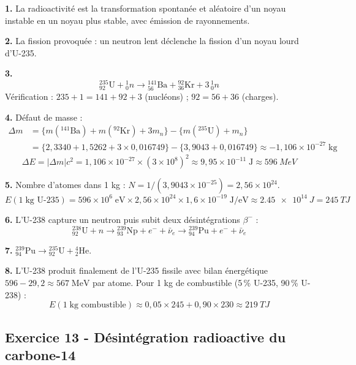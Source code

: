 \documentclass[12pt,a4paper]{article}
\begin{document}
\begin{boitecorrige}
\textbf{1.} La radioactivité est la transformation spontanée et aléatoire d'un noyau instable en un noyau plus stable, avec émission de rayonnements.

\textbf{2.} La fission provoquée : un neutron lent déclenche la fission d'un noyau lourd d'U-235.

\textbf{3.}
\[
{}_{92}^{235}\text{U} + {}_{0}^{1}n \rightarrow {}_{56}^{141}\text{Ba} + {}_{36}^{92}\text{Kr} + 3\,{}_{0}^{1}n
\]
Vérification : $235+1 = 141+92+3$ (nucléons) ; $92 = 56+36$ (charges).

\textbf{4.} Défaut de masse :
\begin{align*}
\Delta m &= \{m({}^{141}\text{Ba}) + m({}^{92}\text{Kr}) + 3m_n\} - \{m({}^{235}\text{U}) + m_n\}\\
&= \{2{,}3340 + 1{,}5262 + 3\times0{,}016749\} - \{3{,}9043 + 0{,}016749\} \approx -1{,}106\times10^{-27}\;\text{kg}
\end{align*}
\[
\Delta E = |\Delta m|c^2 = 1{,}106\times10^{-27}\times(3\times10^8)^2 \approx 9{,}95\times10^{-11}\;\text{J} \approx \qty{596}{MeV}
\]

\textbf{5.} Nombre d'atomes dans 1 kg : $N = 1/(3{,}9043\times10^{-25}) = 2{,}56\times10^{24}$.
\[
E(1\;\text{kg U-235}) = 596\times10^6\;\text{eV}\times2{,}56\times10^{24}\times1{,}6\times10^{-19}\;\text{J/eV} \approx \qty{2.45e14}{J} = \qty{245}{TJ}
\]

\textbf{6.} L'U-238 capture un neutron puis subit deux désintégrations $\beta^-$ :
\[
{}_{92}^{238}\text{U} + n \rightarrow {}_{93}^{239}\text{Np} + e^- + \bar{\nu}_e \rightarrow {}_{94}^{239}\text{Pu} + e^- + \bar{\nu}_e
\]

\textbf{7.} ${}_{94}^{239}\text{Pu} \rightarrow {}_{92}^{235}\text{U} + {}_{2}^{4}\text{He}$.

\textbf{8.} L'U-238 produit finalement de l'U-235 fissile avec bilan énergétique $596 - 29{,}2 \approx 567\;\text{MeV}$ par atome. Pour 1 kg de combustible (5\,\% U-235, 90\,\% U-238) :
\[
E(1\;\text{kg combustible}) \approx 0{,}05\times245 + 0{,}90\times230 \approx \qty{219}{TJ}
\]
\end{boitecorrige}


\subsection*{Exercice 13 - Désintégration radioactive du carbone-14 \niveau{\moyen}}
\end{document}
